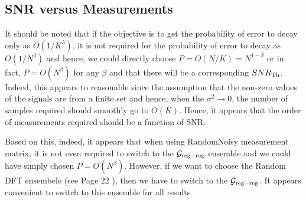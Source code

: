 \documentclass[conference,onecolumn]{IEEEtran}
\begin{document}
\subsection{SNR versus Measurements}
It should be noted that if the objective is to get the probability of error to decay only as $O(1/K^3)$, it is not required for the probability of error to decay as $O(1/N^3)$ and hence, we could directly choose $P = O(N/K) = N^{1-\delta}$ or in fact, $P = O(N^\beta)$ for any $\beta$ and that there will be a corresponding $SNR_{\rm Th}$. Indeed, this appears to reasonable since the assumption that the non-zero values of the signals are from a finite set and hence, when the $\sigma^2 \rightarrow 0$, the number of samples required should smoothly go to $O(K)$. Hence, it appears that the order of measurements required should be a function of SNR.

Based on this, indeed, it appears that when using RandomNoisy measurement matrix, it is not even required to switch to the $\mathcal{G}_{\rm reg-reg}$ ensemble and we could have simply chosen $P = O(N^\beta)$. However, if we want to choose the Random DFT ensembele (see Page 22 \cite{li2015subdraft}), then we have to switch to the $\mathcal{G}_{\rm reg-reg}$. It appears convenient to switch to this ensemble for all results
\end{document}
